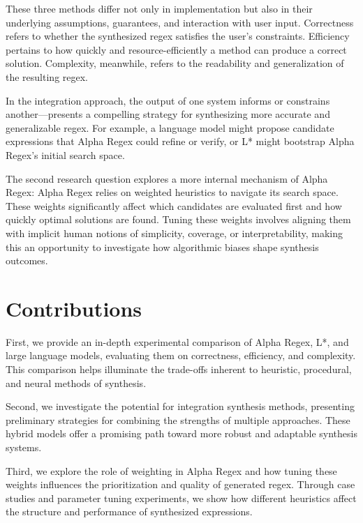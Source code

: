 \indent \indent These three methods differ not only in implementation but also in their underlying assumptions, guarantees, and interaction with user input. Correctness refers to whether the synthesized regex satisfies the user's constraints. Efficiency pertains to how quickly and resource-efficiently a method can produce a correct solution. Complexity, meanwhile, refers to the readability and generalization of the resulting regex.

\indent \indent In the integration approach, the output of one system informs or constrains another—presents a compelling strategy for synthesizing more accurate and generalizable regex. For example, a language model might propose candidate expressions that Alpha Regex could refine or verify, or L* might bootstrap Alpha Regex's initial search space. 

\indent \indent The second research question explores a more internal mechanism of Alpha Regex:  Alpha Regex relies on weighted heuristics to navigate its search space. These weights significantly affect which candidates are evaluated first and how quickly optimal solutions are found. Tuning these weights involves aligning them with implicit human notions of simplicity, coverage, or interpretability, making this an opportunity to investigate how algorithmic biases shape synthesis outcomes.

\vspace{-0.4em}
\section{Contributions}
\vspace{-0.4em}

First, we provide an in-depth experimental comparison of Alpha Regex, L*, and large language models, evaluating them on correctness, efficiency, and complexity. This comparison helps illuminate the trade-offs inherent to heuristic, procedural, and neural methods of synthesis.

\indent \indent Second, we investigate the potential for integration synthesis methods, presenting preliminary strategies for combining the strengths of multiple approaches. These hybrid models offer a promising path toward more robust and adaptable synthesis systems.

\indent \indent Third, we explore the role of weighting in Alpha Regex and how tuning these weights influences the prioritization and quality of generated regex. Through case studies and parameter tuning experiments, we show how different heuristics affect the structure and performance of synthesized expressions. 
